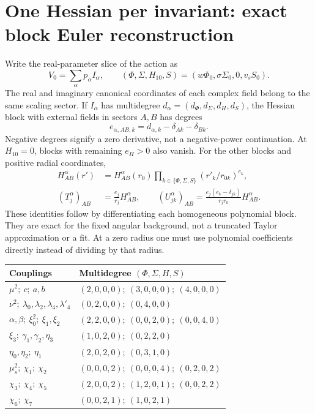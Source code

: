 \documentclass[11pt]{article}
\begin{document}
\section{One Hessian per invariant: exact block Euler reconstruction}
Write the real-parameter slice of the action as
\begin{equation}
 V_0=\sum_\alpha p_\alpha I_\alpha,\qquad
 (\Phi,\Sigma,H_{10},S)=(w\Phi_0,\sigma\Sigma_0,0,v_sS_0).
\end{equation}
The real and imaginary canonical coordinates of each complex field
belong to the same scaling sector. If $I_\alpha$ has multidegree
$d_\alpha=(d_\Phi,d_\Sigma,d_H,d_S)$, the Hessian block with external
fields in sectors $A,B$ has degrees
\begin{equation}
 e_{\alpha,AB,k}=d_{\alpha,k}-\delta_{Ak}-\delta_{Bk}.
\end{equation}
Negative degrees signify a zero derivative, not a negative-power
continuation. At $H_{10}=0$, blocks with remaining $e_H>0$ also vanish.
For the other blocks and positive radial coordinates,
\begin{align}
 H^\alpha_{AB}(r')&=H^\alpha_{AB}(r_0)
     \prod_{k\in\{\Phi,\Sigma,S\}}(r'_k/r_{0k})^{e_k},\\
 (T^\alpha_j)_{AB}&=\frac{e_j}{r_j}H^\alpha_{AB},\qquad
 (U^\alpha_{jk})_{AB}=
 \frac{e_j(e_k-\delta_{jk})}{r_jr_k}H^\alpha_{AB}.
 \label{eq:Euler}
\end{align}
These identities follow by differentiating each homogeneous polynomial
block. They are exact for the fixed angular background, not a truncated
Taylor approximation or a fit. At a zero radius one must use polynomial
coefficients directly instead of dividing by that radius.

\begin{center}\small
\begin{tabular}{ll}
\toprule Couplings & Multidegree $(\Phi,\Sigma,H,S)$\\\midrule
$\mu^2;\ c;\ a,b$ & $(2,0,0,0);\ (3,0,0,0);\ (4,0,0,0)$\\
$\nu^2;\ \lambda_0,\lambda_2,\lambda_4,\lambda'_4$ & $(0,2,0,0);\ (0,4,0,0)$\\
$\alpha,\beta;\ \xi_0^2;\ \xi_1,\xi_2$ & $(2,2,0,0);\ (0,0,2,0);\ (0,0,4,0)$\\
$\xi_3;\ \gamma_1,\gamma_2,\eta_3$ & $(1,0,2,0);\ (0,2,2,0)$\\
$\eta_0,\eta_2;\ \eta_1$ & $(2,0,2,0);\ (0,3,1,0)$\\
$\mu_s^2;\ \chi_1;\ \chi_2$ & $(0,0,0,2);\ (0,0,0,4);\ (0,2,0,2)$\\
$\chi_3;\ \chi_4;\ \chi_5$ & $(2,0,0,2);\ (1,2,0,1);\ (0,0,2,2)$\\
$\chi_6;\ \chi_7$ & $(0,0,2,1);\ (1,0,2,1)$\\\bottomrule
\end{tabular}
\end{center}
\end{document}
